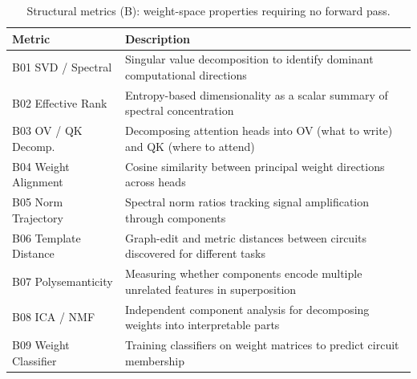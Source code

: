 \documentclass[10pt]{article}
\begin{document}
\begin{table}[H]
\centering
\small
\caption{Structural metrics (B): weight-space properties requiring no forward pass.}
\renewcommand{\arraystretch}{1.12}
\begin{tabular}{@{}lp{10cm}@{}}
\toprule
\textbf{Metric} & \textbf{Description} \\
\midrule
B01 SVD / Spectral & Singular value decomposition to identify dominant computational directions \\
B02 Effective Rank & Entropy-based dimensionality as a scalar summary of spectral concentration \\
B03 OV / QK Decomp. & Decomposing attention heads into OV (what to write) and QK (where to attend) \\
B04 Weight Alignment & Cosine similarity between principal weight directions across heads \\
B05 Norm Trajectory & Spectral norm ratios tracking signal amplification through components \\
B06 Template Distance & Graph-edit and metric distances between circuits discovered for different tasks \\
B07 Polysemanticity & Measuring whether components encode multiple unrelated features in superposition \\
B08 ICA / NMF & Independent component analysis for decomposing weights into interpretable parts \\
B09 Weight Classifier & Training classifiers on weight matrices to predict circuit membership \\
\bottomrule
\end{tabular}
\end{table}
\end{document}
